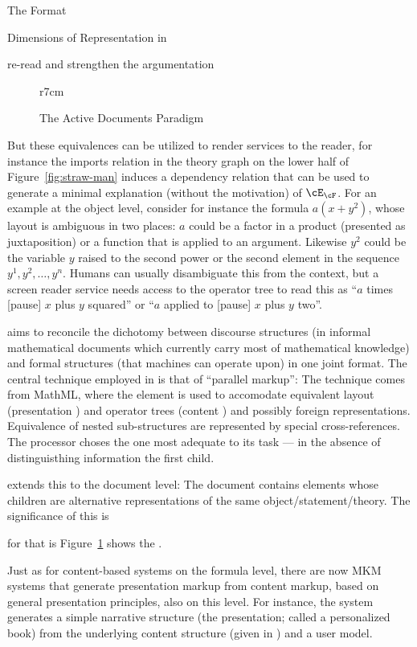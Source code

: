 \begin{omgroup}[creators=miko,id=spec-intro]{The \omdoc Format}
\begin{omgroup}[id=syntax-semantics]{Dimensions of Representation in \omdoc}
\begin{newpart}{re-read and strengthen the argumentation}
\begin{figure}r{7cm}\vspace*{-1em}
\caption{The Active Documents Paradigm}\label{fig:adp}\vspace*{-1em}
\end{figure}
But these equivalences can be utilized to render services to the reader, for instance the
imports relation in the theory graph on the lower half of Figure~\ref{fig:straw-man}
induces a dependency relation that can be used to generate a minimal explanation (without
the motivation) of $\cE_\cF$.  For an example at the object level, consider for instance
the formula $a(x+y^2)$, whose layout is ambiguous in two places: $a$ could be a factor in
a product (presented as juxtaposition) or a function that is applied to an
argument. Likewise $y^2$ could be the variable $y$ raised to the second power or the
second element in the sequence $y^1,y^2,\ldots,y^n$. Humans can usually disambiguate this
from the context, but a screen reader service needs access to the operator tree to read
this as ``$a$ times [pause] $x$ plus $y$ squared'' or ``$a$ applied to [pause] $x$ plus
$y$ two''.

\omdoc aims to reconcile the dichotomy between discourse structures (in informal
mathematical documents which currently carry most of mathematical knowledge) and formal
structures (that machines can operate upon) in one joint format. The central technique
employed in \omdoc is that of ``parallel markup'': The technique comes from MathML, where
the  element is used to accomodate equivalent layout (presentation
{\mathml}) and operator trees (content {\mathml}) and possibly foreign
representations. Equivalence of nested sub-structures are represented by special
cross-references.  The \mathml processor choses the one most adequate to its task --- in
the absence of distinguisthing information the first child.

\omdoc extends this to the document level: The document contains elements whose children
are alternative representations of the same object/statement/theory. The significance of this is

for that is Figure~\ref{fig:adp} shows the .


Just as for content-based systems on the formula level, there are now MKM systems that
generate presentation markup from content markup, based on general presentation
principles, also on this level. For instance, the {}
system~\cite{MelBue:krma03} generates a simple narrative structure (the
presentation; called a personalized book) from the underlying content structure (given in
\omdoc) and a user model.


\end{newpart}
\end{omgroup}
\end{omgroup}
